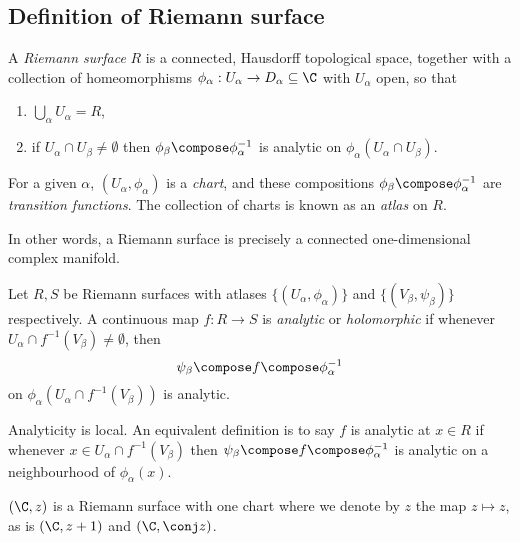 \documentclass[a4paper]{article}
\begin{document}
\subsection{Definition of Riemann surface}

\begin{definition}
  A \emph{Riemann surface} \(R\) is a connected, Hausdorff topological space, together with a collection of homeomorphisms \(\phi_\alpha: U_\alpha \to D_\alpha \subseteq \C\) with \(U_\alpha\) open, so that
  \begin{enumerate}
  \item \(\bigcup_{\alpha} U_\alpha = R\),
  \item if \(U_\alpha \cap U_\beta \neq \emptyset\) then \(\phi_\beta \compose \phi_\alpha^{-1}\) is analytic on \(\phi_\alpha(U_\alpha \cap U_\beta)\).
  \end{enumerate}

  For a given \(\alpha\), \((U_\alpha, \phi_\alpha)\) is a \emph{chart}, and these compositions \(\phi_\beta \compose \phi_\alpha^{-1}\) are \emph{transition functions}. The collection of charts is known as an \emph{atlas} on \(R\).
\end{definition}

In other words, a Riemann surface is precisely a connected one-dimensional complex manifold.

\begin{definition}
  Let \(R, S\) be Riemann surfaces with atlases \(\{(U_\alpha, \phi_\alpha)\}\) and \(\{(V_\beta, \psi_\beta)\}\) respectively. A continuous map \(f: R \to S\) is \emph{analytic} or \emph{holomorphic} if whenever \(U_\alpha \cap f^{-1}(V_\beta) \neq \emptyset\), then
  \[
    \psi_\beta \compose f \compose \phi_\alpha^{-1}
  \]
  on \(\phi_\alpha(U_\alpha \cap f^{-1}(V_\beta))\) is analytic.
\end{definition}

\begin{remark}
  Analyticity is local. An equivalent definition is to say \(f\) is analytic at \(x \in R\) if whenever \(x \in U_\alpha \cap f^{-1}(V_\beta)\) then \(\psi_\beta \compose f \compose \phi_\alpha^{-1}\) is analytic on a neighbourhood of \(\phi_\alpha(x)\).
\end{remark}

\begin{eg}
  \((\C, z)\) is a Riemann surface with one chart where we denote by \(z\) the map \(z \mapsto z\), as is \((\C, z + 1)\) and \((\C, \conj z)\).
\end{eg}
\end{document}
